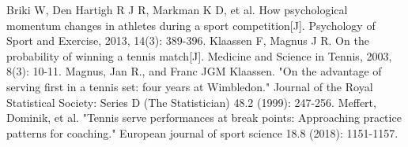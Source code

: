 \newpage
\begin{thebibliography}{99}
    Briki W, Den Hartigh R J R, Markman K D, et al. How psychological momentum changes in athletes during a sport competition[J]. Psychology of Sport and Exercise, 2013, 14(3): 389-396.
    Klaassen F, Magnus J R. On the probability of winning a tennis match[J]. Medicine and Science in Tennis, 2003, 8(3): 10-11.
     Magnus, Jan R., and Franc JGM Klaassen. "On the advantage of serving first in a tennis set: four years at Wimbledon." Journal of the Royal Statistical Society: Series D (The Statistician) 48.2 (1999): 247-256.
    Meffert, Dominik, et al. "Tennis serve performances at break points: Approaching practice patterns for coaching." European journal of sport science 18.8 (2018): 1151-1157.
\end{thebibliography}



